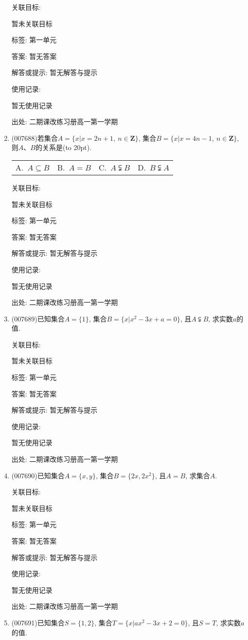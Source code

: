 \documentclass[10pt,a4paper]{article}
\newcommand{\bracket}[1]{(\hbox to #1pt{})}
\newcommand{\fourch}[4]{\par\begin{tabular}{p{.23\textwidth}p{.23\textwidth}p{.23\textwidth}p{.23\textwidth}}
A.~#1 &B.~#2& C.~#3& D.~#4
\end{tabular}}
\begin{document}
\begin{enumerate}[1.]
关联目标:

暂未关联目标



标签: 第一单元

答案: 暂无答案

解答或提示: 暂无解答与提示

使用记录:

暂无使用记录


出处: 二期课改练习册高一第一学期
\item { (007688)}若集合$A=\{x|x=2n+1, \ n\in \mathbf{Z}\}$, 集合$B=\{x|x=4n-1, \ n\in \mathbf{Z}\}$, 则$A$、$B$的关系是\bracket{20}.
\fourch{$A\subseteq B$}{$A=B$}{$A\subsetneqq B$}{$B\subsetneqq A$}


关联目标:

暂未关联目标



标签: 第一单元

答案: 暂无答案

解答或提示: 暂无解答与提示

使用记录:

暂无使用记录


出处: 二期课改练习册高一第一学期
\item { (007689)}已知集合$A=\{1\}$, 集合$B=\{x|x^2-3x+a=0\}$, 且$A\subsetneqq B$, 求实数$a$的值.


关联目标:

暂未关联目标



标签: 第一单元

答案: 暂无答案

解答或提示: 暂无解答与提示

使用记录:

暂无使用记录


出处: 二期课改练习册高一第一学期
\item { (007690)}已知集合$A=\{x,y\}$, 集合$B=\{2x,2x^2\}$, 且$A=B$, 求集合$A$.


关联目标:

暂未关联目标



标签: 第一单元

答案: 暂无答案

解答或提示: 暂无解答与提示

使用记录:

暂无使用记录


出处: 二期课改练习册高一第一学期
\item { (007691)}已知集合$S=\{1,2\}$, 集合$T=\{x|ax^2-3x+2=0\}$, 且$S=T$, 求实数$a$的值.



\end{enumerate}
\end{document}
